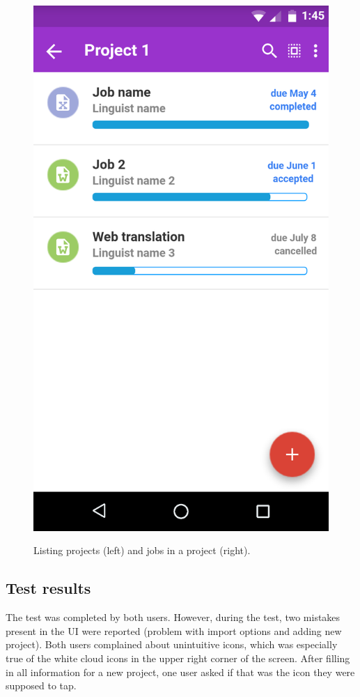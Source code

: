 \begin{figure}
\begin{minipage}{.5\textwidth}
	\end{minipage}%
	\begin{minipage}{.5\textwidth}
		\centering
		\includegraphics[width=.74\linewidth]{pics/protoProject1}
		
		\label{fig:proto}
	\end{minipage}
	\caption{Listing projects (left) and jobs in a project (right).}
\end{figure}


\subsection{Test results}

The test was completed by both users. However, during the test, two mistakes present in the UI were reported (problem with import options and adding new project). Both users complained about unintuitive icons, which was especially true of the white cloud icons in the upper right corner of the screen. After filling in all information for a new project, one user asked if that was the icon they were supposed to tap.

